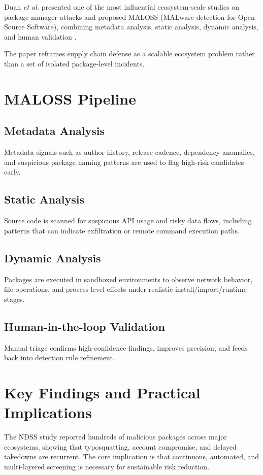 Duan \textit{et al.} presented one of the most influential ecosystem-scale studies on package
manager attacks and proposed MALOSS (MALware detection for Open Source Software), combining
metadata analysis, static analysis, dynamic analysis, and human validation \citep{duan2021ndss}.

The paper reframes supply chain defense as a scalable ecosystem problem rather than a set of
isolated package-level incidents.

\section{MALOSS Pipeline}

\subsection{Metadata Analysis}
Metadata signals such as author history, release cadence, dependency anomalies,
and suspicious package naming patterns are used to flag high-risk candidates early.

\subsection{Static Analysis}
Source code is scanned for suspicious API usage and risky data flows,
including patterns that can indicate exfiltration or remote command execution paths.

\subsection{Dynamic Analysis}
Packages are executed in sandboxed environments to observe network behavior,
file operations, and process-level effects under realistic install/import/runtime stages.

\subsection{Human-in-the-loop Validation}
Manual triage confirms high-confidence findings, improves precision,
and feeds back into detection rule refinement.

\section{Key Findings and Practical Implications}

The NDSS study reported hundreds of malicious packages across major ecosystems,
showing that typosquatting, account compromise, and delayed takedowns are recurrent.
The core implication is that continuous, automated, and multi-layered screening is
necessary for sustainable risk reduction.

